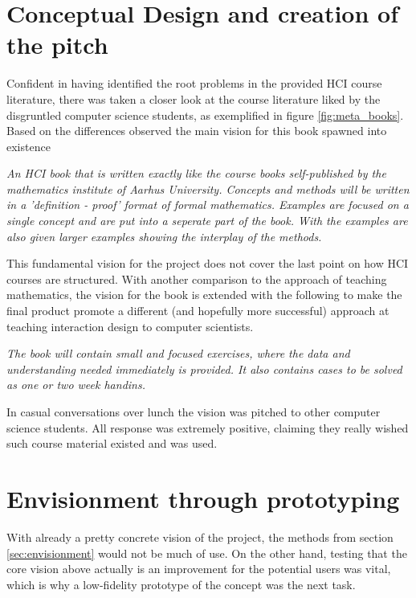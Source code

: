 

\section*{Conceptual Design and creation of the pitch}
Confident in having identified the root problems in the provided HCI course literature, there was taken a closer look at the course literature liked by the disgruntled computer science students, as exemplified in figure \ref{fig:meta_books}. Based on the differences observed the main vision for this book spawned into existence

\begin{displayquote}
  \emph{An HCI book that is written exactly like the course books self-published by the mathematics institute of Aarhus University. Concepts and methods will be written in a 'definition - proof' format of formal mathematics. Examples are focused on a single concept and are put into a seperate part of the book. With the examples are also given larger examples showing the interplay of the methods.}
\end{displayquote}

This fundamental vision for the project does not cover the last point on how HCI courses are structured. With another comparison to the approach of teaching mathematics, the vision for the book is extended with the following to make the final product promote a different (and hopefully more successful) approach at teaching interaction design to computer scientists.

\begin{displayquote}
  \emph{The book will contain small and focused exercises, where the data and understanding needed immediately is provided. It also contains cases to be solved as one or two week handins.}
\end{displayquote}

In casual conversations over lunch the vision was pitched to other computer science students. All response was extremely positive, claiming they really wished such course material existed and was used.

\section*{Envisionment through prototyping}
With already a pretty concrete vision of the project, the methods from section \ref{sec:envisionment} would not be much of use. On the other hand, testing that the core vision above actually is an improvement for the potential users was vital, which is why a low-fidelity prototype of the concept was the next task.

